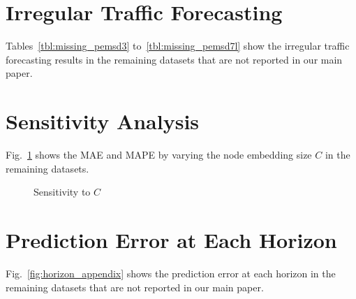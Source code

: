 \documentclass[letterpaper]{article} \usepackage{aaai22}  \usepackage{times}  \usepackage{helvet}  \usepackage{courier}  \usepackage[hyphens]{url}  \usepackage{graphicx} \urlstyle{rm} \def\UrlFont{\rm}  \usepackage{natbib}  \usepackage{caption} \DeclareCaptionStyle{ruled}{labelfont=normalfont,labelsep=colon,strut=off} \frenchspacing  \setlength{\pdfpagewidth}{8.5in}  \setlength{\pdfpageheight}{11in}  \usepackage{stfloats}
\begin{document}
\section{Irregular Traffic Forecasting}
Tables~\ref{tbl:missing_pemsd3} to~\ref{tbl:missing_pemsd7l} show the irregular traffic forecasting results in the remaining datasets that are not reported in our main paper.



\section{Sensitivity Analysis}
Fig.~\ref{fig:sensitivity_appendix} shows the MAE and MAPE by varying the node embedding size $C$ in the remaining datasets.


\begin{figure}[t]
    \centering
    \caption{Sensitivity to $C$}
    \label{fig:sensitivity_appendix}
\end{figure}

\section{Prediction Error at Each Horizon}
Fig.~\ref{fig:horizon_appendix} shows the prediction error at each horizon in the remaining datasets that are not reported in our main paper.
\end{document}
